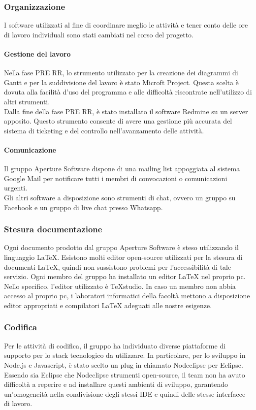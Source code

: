 \subsubsection{Organizzazione}
I software utilizzati al fine di coordinare meglio le attività e tener conto delle ore di lavoro individuali sono stati cambiati nel corso del progetto.\\
\paragraph{Gestione del lavoro}
Nella fase PRE RR, lo strumento utilizzato per la creazione dei diagrammi di Gantt e per la suddivisione del lavoro è stato Microft Project. Questa scelta è dovuta alla facilità d'uso del programma e alle difficoltà riscontrate nell'utilizzo di altri strumenti.\\
Dalla fine della fase PRE RR, è stato installato il software Redmine su un server apposito. Questo strumento consente di avere una gestione più accurata del sistema di ticketing e del controllo nell'avanzamento delle attività.
\paragraph{Comunicazione}
Il gruppo Aperture Software dispone di una mailing list appoggiata al sistema Google Mail per notificare tutti i membri di convocazioni o comunicazioni urgenti.\\
Gli altri software a disposizione sono strumenti di chat, ovvero un gruppo su Facebook e un gruppo di live chat presso Whatsapp. 

\subsubsection{Stesura documentazione}
Ogni documento prodotto dal gruppo Aperture Software è steso utilizzando il linguaggio \LaTeX{}. Esistono molti editor open-source utilizzati per la stesura di documenti \LaTeX{}, quindi non sussistono problemi per l'accessibilità di tale servizio. Ogni membro del gruppo ha installato un editor \LaTeX{} nel proprio pc. Nello specifico, l'editor utilizzato è TeXstudio. In caso un membro non abbia accesso al proprio pc, i laboratori informatici della facoltà mettono a disposizione editor appropriati e compilatori \LaTeX{} adeguati alle nostre esigenze.

\subsubsection{Codifica}
Per le attività di codifica, il gruppo ha individuato diverse piattaforme di supporto per lo stack tecnologico da utilizzare. In particolare, per lo sviluppo in Node.js e Javascript, è stato scelto un plug in chiamato Nodeclipse per Eclipse.\\
Essendo sia Eclipse che Nodeclipse strumenti open-source, il team non ha avuto difficoltà a reperire e ad installare questi ambienti di sviluppo, garantendo un'omogeneità nella condivisione degli stessi IDE e quindi delle stesse interfacce di lavoro.


